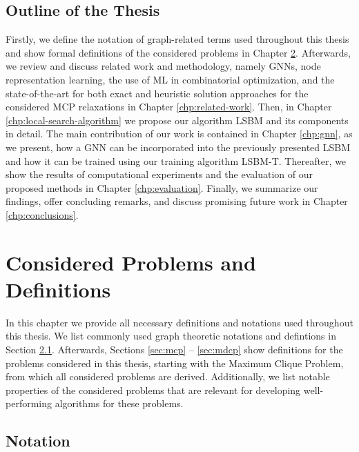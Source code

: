 \documentclass[draft,final]{vutinfth} %
\begin{document}
\section{Outline of the Thesis}\label{sec:outline}
Firstly, we define the notation of graph-related terms used throughout this thesis and show formal definitions of the considered problems in Chapter \ref{chp:problems-definitions}. 
Afterwards, we review and discuss related work and methodology, namely GNNs, node representation learning, the use of ML in combinatorial optimization, and the state-of-the-art for both exact and heuristic solution approaches for the considered MCP relaxations in Chapter \ref{chp:related-work}. 
Then, in Chapter \ref{chp:local-search-algorithm} we propose our algorithm LSBM and its components in detail. The main contribution of our work is contained in Chapter \ref{chp:gnn}, as we present, how a GNN can be incorporated into the previously presented LSBM and how it can be trained using our training algorithm LSBM-T. Thereafter, we show the results of computational experiments and the evaluation of our proposed methods in Chapter \ref{chp:evaluation}. Finally, we summarize our findings, offer concluding remarks, and discuss promising future work in Chapter \ref{chp:conclusions}. 

\chapter{Considered Problems and Definitions}\label{chp:problems-definitions}

In this chapter we provide all necessary definitions and notations used throughout this thesis. We list commonly used graph theoretic notations and defintions in Section \ref{sec:notation}. Afterwards, Sections \ref{sec:mcp} -- \ref{sec:mdcp} show definitions for the problems considered in this thesis, starting with the Maximum Clique Problem, from which all considered problems are derived. Additionally, we list notable properties of the considered problems that are relevant for developing well-performing algorithms for these problems. 

\section{Notation}\label{sec:notation}
\end{document}
